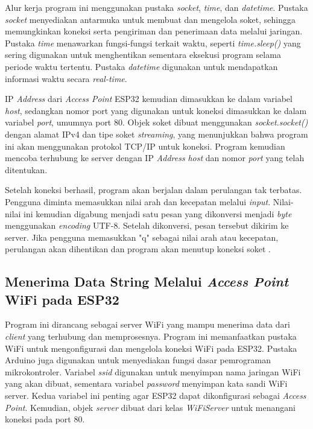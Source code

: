 Alur kerja program ini menggunakan pustaka \emph{socket}, \emph{time}, dan \emph{datetime}. Pustaka \emph{socket} menyediakan antarmuka untuk membuat dan mengelola soket, sehingga memungkinkan koneksi serta pengiriman dan penerimaan data melalui jaringan. Pustaka \emph{time} menawarkan fungsi-fungsi terkait waktu, seperti \emph{time.sleep()} yang sering digunakan untuk menghentikan sementara eksekusi program selama periode waktu tertentu. Pustaka \emph{datetime} digunakan untuk mendapatkan informasi waktu secara \emph{real-time}.

IP \emph{Address} dari \emph{Access Point} ESP32 kemudian dimasukkan ke dalam variabel \emph{host}, sedangkan nomor port yang digunakan untuk koneksi dimasukkan ke dalam variabel \emph{port}, umumnya port 80. Objek soket dibuat menggunakan \emph{socket.socket()} dengan alamat IPv4 dan tipe soket \emph{streaming}, yang menunjukkan bahwa program ini akan menggunakan protokol TCP/IP untuk koneksi. Program kemudian mencoba terhubung ke server dengan IP \emph{Address} \emph{host} dan nomor \emph{port} yang telah ditentukan.

Setelah koneksi berhasil, program akan berjalan dalam perulangan tak terbatas. Pengguna diminta memasukkan nilai arah dan kecepatan melalui \emph{input}. Nilai-nilai ini kemudian digabung menjadi satu pesan yang dikonversi menjadi \emph{byte} menggunakan \emph{encoding} UTF-8. Setelah dikonversi, pesan tersebut dikirim ke server. Jika pengguna memasukkan "q" sebagai nilai arah atau kecepatan, perulangan akan dihentikan dan program akan menutup koneksi soket \parencite{ekatama2024perancangan}.

\subsection{Menerima Data String Melalui \emph{Access Point} WiFi pada ESP32}

Program ini dirancang sebagai server WiFi yang mampu menerima data dari \emph{client} yang terhubung dan memprosesnya. Program ini memanfaatkan pustaka WiFi untuk mengonfigurasi dan mengelola koneksi WiFi pada ESP32. Pustaka Arduino juga digunakan untuk menyediakan fungsi dasar pemrograman mikrokontroler. Variabel \emph{ssid} digunakan untuk menyimpan nama jaringan WiFi yang akan dibuat, sementara variabel \emph{password} menyimpan kata sandi WiFi server. Kedua variabel ini penting agar ESP32 dapat dikonfigurasi sebagai \emph{Access Point}. Kemudian, objek \emph{server} dibuat dari kelas \emph{WiFiServer} untuk menangani koneksi pada port 80.

